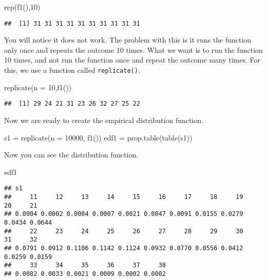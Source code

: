 \documentclass[
]{article}
\newenvironment{Shaded}{\begin{snugshade}}{\end{snugshade}}
\newcommand{\AttributeTok}[1]{\textcolor[rgb]{0.77,0.63,0.00}{#1}}
\newcommand{\DecValTok}[1]{\textcolor[rgb]{0.00,0.00,0.81}{#1}}
\newcommand{\FunctionTok}[1]{\textcolor[rgb]{0.00,0.00,0.00}{#1}}
\newcommand{\NormalTok}[1]{#1}
\newcommand{\OtherTok}[1]{\textcolor[rgb]{0.56,0.35,0.01}{#1}}
\begin{document}
\begin{Shaded}
\begin{Highlighting}[]
\FunctionTok{rep}\NormalTok{(}\FunctionTok{f1}\NormalTok{(),}\DecValTok{10}\NormalTok{)}
\end{Highlighting}
\end{Shaded}

\begin{verbatim}
##  [1] 31 31 31 31 31 31 31 31 31 31
\end{verbatim}

You will notice it does not work. The problem with this is it runs the
function only once and repeats the outcome 10 times. What we want is to
run the function 10 times, and not run the function once and repeat the
outcome many times. For this, we use a function called
\texttt{replicate()}.

\begin{Shaded}
\begin{Highlighting}[]
\FunctionTok{replicate}\NormalTok{(}\AttributeTok{n =} \DecValTok{10}\NormalTok{,}\FunctionTok{f1}\NormalTok{())}
\end{Highlighting}
\end{Shaded}

\begin{verbatim}
##  [1] 29 24 21 31 23 26 32 27 25 22
\end{verbatim}

Now we are ready to create the empirical distribution function.

\begin{Shaded}
\begin{Highlighting}[]
\NormalTok{s1 }\OtherTok{=} \FunctionTok{replicate}\NormalTok{(}\AttributeTok{n =} \DecValTok{10000}\NormalTok{, }\FunctionTok{f1}\NormalTok{())}
\NormalTok{edf1 }\OtherTok{=} \FunctionTok{prop.table}\NormalTok{(}\FunctionTok{table}\NormalTok{(s1))}
\end{Highlighting}
\end{Shaded}

Now you can see the distribution function.

\begin{Shaded}
\begin{Highlighting}[]
\NormalTok{edf1}
\end{Highlighting}
\end{Shaded}

\begin{verbatim}
## s1
##     11     12     13     14     15     16     17     18     19     20     21 
## 0.0004 0.0002 0.0004 0.0007 0.0021 0.0047 0.0091 0.0155 0.0279 0.0434 0.0644 
##     22     23     24     25     26     27     28     29     30     31     32 
## 0.0791 0.0912 0.1106 0.1142 0.1124 0.0932 0.0770 0.0556 0.0412 0.0259 0.0159 
##     33     34     35     36     37     38 
## 0.0082 0.0033 0.0021 0.0009 0.0002 0.0002
\end{verbatim}
\end{document}
